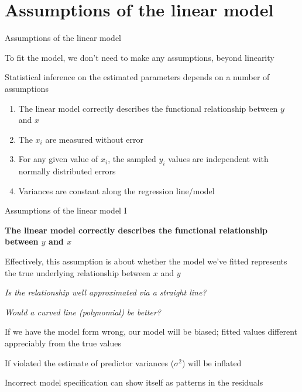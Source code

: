 \documentclass[10pt,ignorenonframetext,compress, aspectratio=169]{beamer}
\providecommand{\tightlist}{%
  \setlength{\itemsep}{0pt}\setlength{\parskip}{0pt}}
\begin{document}
\section{Assumptions of the linear
model}\label{assumptions-of-the-linear-model}

\begin{frame}{Assumptions of the linear model}

To fit the model, we don't need to make any assumptions, beyond
linearity

\alert{Statistical inference} on the estimated parameters depends on a
number of assumptions

\begin{enumerate}
\def\labelenumi{\arabic{enumi}.}
\tightlist
\item
  The linear model correctly describes the functional relationship
  between \(y\) and \(x\)
\item
  The \(x_i\) are measured without error
\item
  For any given value of \(x_i\), the sampled \(y_i\) values are
  \alert{independent} with normally distributed errors
\item
  Variances are constant along the regression line/model
\end{enumerate}

\end{frame}

\begin{frame}{Assumptions of the linear model I}

\textbf{The linear model correctly describes the functional relationship
between \(y\) and \(x\)}

Effectively, this assumption is about whether the model we've fitted
represents the true underlying relationship between \(x\) and \(y\)

\emph{Is the relationship well approximated via a straight line?}

\emph{Would a curved line (\alert{polynomial}) be better?}

If we have the model form wrong, our model will be \alert{biased};
fitted values different appreciably from the true values

If violated the estimate of predictor variances (\(\sigma^2\)) will be
inflated

Incorrect model specification can show itself as patterns in the
residuals

\end{frame}
\end{document}
